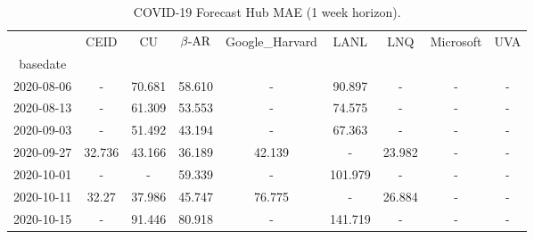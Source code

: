 \begin{table*}[t]
\small
\caption{COVID-19 Forecast Hub MAE (1 week horizon).\label{tab:reichalb_eval_1} }

\centering
    
\begin{tabular}{ccccccccc}
\toprule
{} &                           CEID &       CU &                         $\beta\text{-AR}$ & Google\_Harvard &                           LANL &                            LNQ &                     Microsoft &      UVA \\
basedate   &                                &          &                                &                 &                                &                                &                               &          \\
\midrule
2020-08-06 &                              - &   70.681 &   {\cellcolor{blue!25} 58.610} &               - &                         90.897 &                              - &                             - &        - \\
2020-08-13 &                              - &   61.309 &   {\cellcolor{blue!25} 53.553} &               - &                         74.575 &                              - &                             - &        - \\
2020-09-03 &                              - &   51.492 &   {\cellcolor{blue!25} 43.194} &               - &                         67.363 &                              - &                             - &        - \\
2020-09-27 &                         32.736 &   43.166 &                         36.189 &          42.139 &                              - &   {\cellcolor{blue!25} 23.982} &                             - &        - \\
2020-10-01 &                              - &        - &   {\cellcolor{blue!25} 59.339} &               - &                        101.979 &                              - &                             - &        - \\
2020-10-11 &                          32.27 &   37.986 &                         45.747 &          76.775 &                              - &   {\cellcolor{blue!25} 26.884} &                             - &        - \\
2020-10-15 &                              - &   91.446 &   {\cellcolor{blue!25} 80.918} &               - &                        141.719 &                              - &                             - &        - \\

\end{tabular}
\end{table*}
